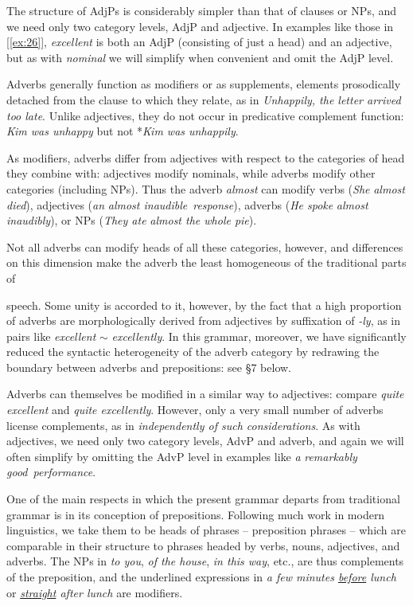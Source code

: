 The structure of AdjPs is considerably simpler than that of clauses or NPs, and we need only two category levels, AdjP and adjective. In examples like those in [\ref{ex:26}], \textit{excellent} is both an AdjP (consisting of just a head) and an adjective, but as with \textit{nominal} we will simplify when convenient and omit the AdjP level.

Adverbs generally function as modifiers or as supplements, elements prosodically detached from the clause to which they relate, as in \textit{Unhappily, the letter arrived too late}. Unlike adjectives, they do not occur in predicative complement function: \textit{Kim was unhappy} but not *\textit{Kim was unhappily}.

As modifiers, adverbs differ from adjectives with respect to the categories of head they combine with: adjectives modify nominals, while adverbs modify other categories (including NPs). Thus the adverb \textit{almost} can modify verbs (\textit{She} \ob\textit{almost died}\cb), adjectives (\textit{an} \ob\textit{almost inaudible}\cb\ \textit{response}), adverbs (\textit{He spoke} \ob\textit{almost inaudibly}\cb), or NPs (\textit{They ate} \ob\textit{almost the whole pie}\cb).

Not all adverbs can modify heads of all these categories, however, and differences on this dimension make the adverb the least homogeneous of the traditional parts of

\newpage

\noindent speech. Some unity is accorded to it, however, by the fact that a high proportion of adverbs are morphologically derived from adjectives by suffixation of \textit{-ly}, as in pairs like \textit{excellent} $\sim$ \textit{excellently}. In this grammar, moreover, we have significantly reduced the syntactic heterogeneity of the adverb category by redrawing the boundary between adverbs and prepositions: see §7 below.

Adverbs can themselves be modified in a similar way to adjectives: compare \textit{quite excellent} and \textit{quite excellently}. However, only a very small number of adverbs license complements, as in \textit{independently of such considerations}. As with adjectives, we need only two category levels, AdvP and adverb, and again we will often simplify by omitting the AdvP level in examples like \textit{a} \ob\textit{remarkably good}\cb\ \textit{performance}.


One of the main respects in which the present grammar departs from traditional grammar is in its conception of prepositions. Following much work in modern linguistics, we take them to be heads of phrases -- preposition phrases -- which are comparable in their structure to phrases headed by verbs, nouns, adjectives, and adverbs. The NPs in \textit{to you}, \textit{of the house}, \textit{in this way}, etc., are thus complements of the preposition, and the underlined expressions in \textit{a few minutes \uline{before} lunch} or \textit{\uline{straight} after lunch} are modifiers.


